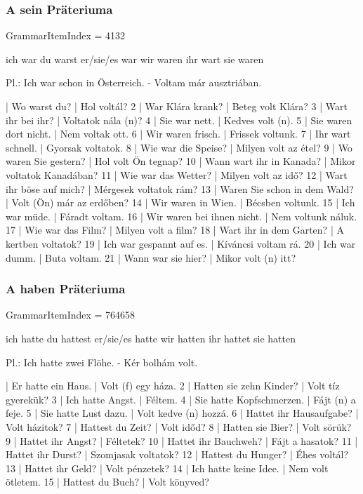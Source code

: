 \documentclass{article}
\newenvironment{desc}{\verbatim}{\endverbatim}
\newenvironment{exmp}{\verbatim}{\endverbatim}
\begin{document}
\subsubsection{A sein Präteriuma}

GrammarItemIndex = 4132

\begin{desc}
ich war
du warst
er/sie/es war
wir waren
ihr wart
sie waren

Pl.: Ich war schon in Österreich. - Voltam már ausztriában.
\end{desc}

\begin{exmp}
1 | Wo warst du? | Hol voltál?
2 | War Klára krank? | Beteg volt Klára?
3 | Wart ihr bei ihr? | Voltatok nála (n)?
4 | Sie war nett. | Kedves volt (n).
5 | Sie waren dort nicht. | Nem voltak ott.
6 | Wir waren frisch. | Frissek voltunk.
7 | Ihr wart schnell. | Gyorsak voltatok.
8 | Wie war die Speise? | Milyen volt az étel?
9 | Wo waren Sie gestern? | Hol volt Ön tegnap?
10 | Wann wart ihr in Kanada? | Mikor voltatok Kanadában?
11 | Wie war das Wetter? | Milyen volt az idő?
12 | Wart ihr böse auf mich? | Mérgesek voltatok rám?
13 | Waren Sie schon in dem Wald? | Volt (Ön) már az erdőben?
14 | Wir waren in Wien. | Bécsben voltunk.
15 | Ich war müde. | Fáradt voltam.
16 | Wir waren bei ihnen nicht. | Nem voltunk náluk.
17 | Wie war das Film? | Milyen volt a film?
18 | Wart ihr in dem Garten? | A kertben voltatok?
19 | Ich war gespannt auf es. | Kíváncsi voltam rá.
20 | Ich war dumm. | Buta voltam.
21 | Wann war sie hier? | Mikor volt (n) itt?
\end{exmp}

\subsubsection{A haben Präteriuma}

GrammarItemIndex = 764658

\begin{desc}
ich hatte
du hattest
er/sie/es hatte
wir hatten
ihr hattet
sie hatten

Pl.: Ich hatte zwei Flöhe. - Kér bolhám volt.
\end{desc}

\begin{exmp}
1 | Er hatte ein Haus. | Volt (f) egy háza.
2 | Hatten sie zehn Kinder? | Volt tíz gyerekük?
3 | Ich hatte Angst. | Féltem.
4 | Sie hatte Kopfschmerzen. | Fájt (n) a feje.
5 | Sie hatte Lust dazu. | Volt kedve (n) hozzá.
6 | Hattet ihr Hausaufgabe? | Volt házitok?
7 | Hattest du Zeit? | Volt időd?
8 | Hatten sie Bier? | Volt sörük?
9 | Hattet ihr Angst? | Féltetek?
10 | Hattet ihr Bauchweh? | Fájt a hasatok?
11 | Hattet ihr Durst? | Szomjasak voltatok?
12 | Hattest du Hunger? | Éhes voltál?
13 | Hattet ihr Geld? | Volt pénzetek?
14 | Ich hatte keine Idee. | Nem volt ötletem.
15 | Hattest du Buch? | Volt könyved?
\end{exmp}
\end{document}
